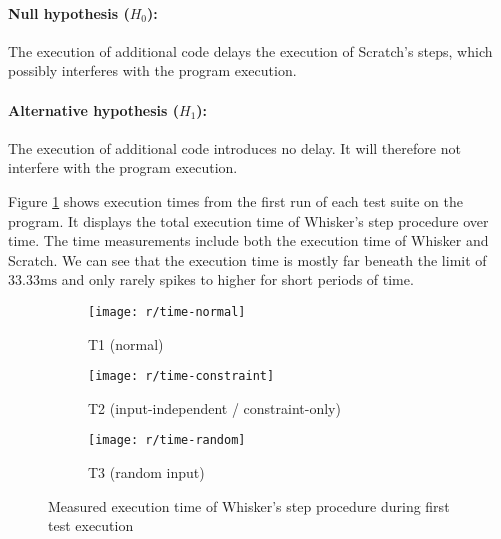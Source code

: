 \paragraph{Null hypothesis ($H_0$):}
The execution of additional code delays the execution of Scratch's steps, which possibly interferes with the program execution.
\vspace{-\medskipamount}
\paragraph{Alternative hypothesis ($H_1$):}
The execution of additional code introduces no delay. It will therefore not interfere with the program execution.
\parspace

Figure \ref{fig:time_line_plot} shows execution times from the first run of each test suite on the program.
It displays the total execution time of Whisker's step procedure over time.
The time measurements include both the execution time of Whisker and Scratch.
We can see that the execution time is mostly far beneath the limit of $33.33\text{ms}$
and only rarely spikes to higher for short periods of time.
\parspace

\begin{figure}[htpb]
    \centering

    \begin{subfigure}{\textwidth}
        \centering
        \texttt{[image: r/time-normal]}
        \vspace{-\medskipamount}
        \caption{T1 (normal)}
    \end{subfigure}

    \begin{subfigure}{\textwidth}
        \centering
        \texttt{[image: r/time-constraint]}
        \vspace{-\medskipamount}
        \caption{T2 (input-independent / constraint-only)}
    \end{subfigure}

    \begin{subfigure}{\textwidth}
        \centering
        \texttt{[image: r/time-random]}
        \vspace{-\medskipamount}
        \caption{T3 (random input)}
    \end{subfigure}

    \caption{Measured execution time of Whisker's step procedure during first test execution}
    \label{fig:time_line_plot}
\end{figure}

